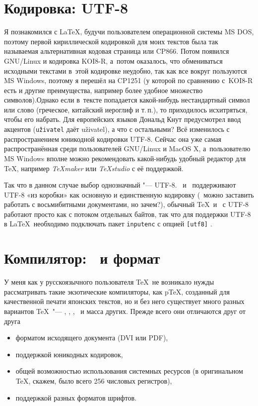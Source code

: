 \documentclass[a4paper,12pt,hyphens]{article}
\newcommand\softname[1]{\textit{#1}}
\newcommand\package[1]{\texttt{#1}}
\newcommand\lcmd[1]{\texttt{#1}}
\begin{document}
\section{Кодировка: UTF-8}
Я познакомился с \LaTeX, будучи пользователем операционной системы MS DOS,
поэтому первой кириллической кодировкой для моих текстов была так называемая
альтернативная кодовая страница или CP866. Потом появился GNU/Linux и кодировка
KOI8-R, а~потом оказалось, что обмениваться исходными текстами в~этой кодировке
неудобно, так как все вокруг пользуются MS Windows, поэтому я перешёл на
CP1251 (у которой по сравнению с~KOI8-R есть и другие преимущества, например
более удобное множество символов).\break Однако если в~тексте попадается какой-нибудь
нестандартный символ или слово (греческое, китайский иероглиф и т.\,п.), то
приходилось исхитряться, чтобы его набрать. Для европейских языков Дональд Кнут
предусмотрел ввод акцентов (\lcmd{u\v{z}ivatel} даёт u\v{z}ivatel), а что с
остальными? Всё изменилось с распространением юникодной кодировки UTF-8. Сейчас
она уже самая распространённая среди пользователей GNU/Linux и MacOS X,
а~пользователю MS Windows вполне можно рекомендовать какой-нибудь удобный
редактор для \TeX, например \softname{TeXmaker} \parencite{site-texmaker}
или \softname{TeXstudio} \parencite{site-texstudio} с её поддержкой.

Так что в данном случае выбор однозначный "--- UTF-8. \LuaTeX\ и \XeTeX\ поддерживают
UTF-8 «из коробки» как основную и единственную кодировку (\LuaLaTeX\ можно
заставить работать с восьмибитными документами, но зачем?), обычный \TeX\
и \pdfTeX\ с UTF-8 работают просто как с потоком отдельных байтов, так что
для поддержки UTF-8 в \LaTeX\ необходимо подключать пакет \package{inputenc}
с опцией \lcmd{[utf8]} \parencite{ctan-inputenc}.

\section{Компилятор: \LuaTeX\ и формат \LuaLaTeX}
У меня как у русскоязычного пользователя \TeX\ не возникало нужды рассматривать
такие экзотические компиляторы, как p\TeX, созданный для качественной печати японских
текстов, но и без него существует много разных вариантов \TeX\ "--- \eTeX, \pdfTeX,
\XeTeX, \LuaTeX\ и масса других. Прежде всего они отличаются
друг от друга
\begin{itemize}
\item форматом исходящего документа (DVI или PDF),
\item поддержкой юникодных кодировок,
\item общей возможностью использования системных ресурсов (в оригинальном \TeX,
скажем, было всего 256 числовых регистров),
\item поддержкой разных форматов шрифтов.
\end{itemize}
\end{document}
